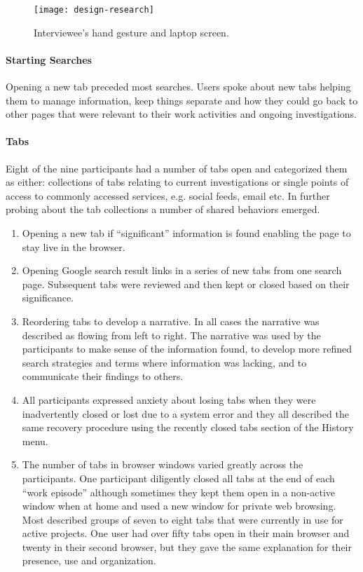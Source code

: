 \begin{figure}[!htb]
	\centering
	\texttt{[image: design-research]}
	\caption{Interviewee's hand gesture and laptop screen.}
	\label{fig:sm-design-research}
\end{figure}

\paragraph{Starting Searches}
Opening a new tab preceded most searches. Users spoke about new tabs helping them to manage information, keep things separate and how they could go back to other pages that were relevant to their work activities and ongoing investigations.

\paragraph{Tabs}
Eight of the nine participants had a number of tabs open and categorized them as either: collections of tabs relating to current investigations or single points of access to commonly accessed services, e.g. social feeds, email etc. In further probing about the tab collections a number of shared behaviors emerged.

\begin{enumerate}
	\item Opening a new tab if ``significant'' information is found enabling the page to stay live in the browser.
	\item Opening Google search result links in a series of new tabs from one search page. Subsequent tabs were reviewed and then kept or closed based on their significance.
	\item Reordering tabs to develop a narrative. In all cases the narrative was described as flowing from left to right. The narrative was used by the participants to make sense of the information found, to develop more refined search strategies and terms where information was lacking, and to communicate their findings to others.
	\item All participants expressed anxiety about losing tabs when they were inadvertently closed or lost due to a system error and they all described the same recovery procedure using the recently closed tabs section of the History menu.
	\item The number of tabs in browser windows varied greatly across the participants. One participant diligently closed all tabs at the end of each ``work episode'' although sometimes they kept them open in a non-active window when at home and used a new window for private web browsing. Most described groups of seven to eight tabs that were currently in use for active projects. One user had over fifty tabs open in their main browser and twenty in their second browser, but they gave the same explanation for their presence, use and organization.
\end{enumerate}

